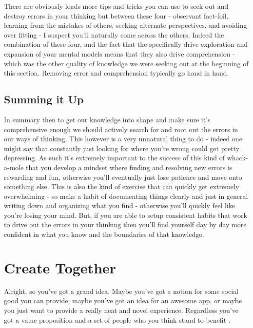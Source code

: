 \documentclass[11pt,a5paper]{book}
\begin{document}
There are obviously loads more tips and tricks you can use to seek out and destroy errors in your thinking but between these four - observant fact-foil, learning from the mistakes of others, seeking alternate perspectives, and avoiding over fitting - I suspect you'll naturally come across the others. Indeed the combination of these four, and the fact that the specifically drive exploration and expansion of your mental models means that they also drive comprehension - which was the other quality of knowledge we were seeking out at the beginning of this section. Removing error and comprehension typically go hand in hand. 
\newline



\subsection{Summing it Up}
In summary then to get our knowledge into shape and make sure it's comprehensive enough we should actively search for and root out the errors in our ways of thinking. This however is a very unnatural thing to do - indeed one might say that constantly just looking for where you're wrong could get pretty depressing. As such it's extremely important to the success of this kind of whack-a-mole that you develop a mindset where finding and resolving new errors is rewarding and fun, otherwise you'll eventually just lose patience and move onto something else. This is also the kind of exercise that can quickly get extremely overwhelming - so make a habit of documenting things clearly and just in general writing down and organizing what you find - otherwise you'll quickly feel like you're losing your mind. But, if you are able to setup consistent habits that work to drive out the errors in your thinking then you'll find yourself day by day more confident in what you know and the boundaries of that knowledge.

\section{Create Together}
Alright, so you've got a grand idea. Maybe you've got a notion for some social good you can provide, maybe you've got an idea for an awesome app, or maybe you just want to provide a really neat and novel experience. Regardless you've got a value proposition and a set of people who you think stand to benefit \cite{valueprop}. 
\newline
\end{document}
